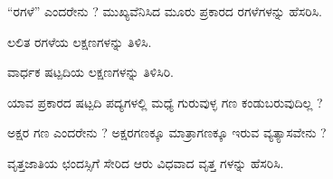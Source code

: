 \vspace{2.5pt plus 3pt minus 0.5pt}\noindent\hspace*{1.2em}\hspace{0.55em}“ರಗಳೆ” ಎಂದರೇನು ? ಮುಖ್ಯವೆನಿಸಿದ ಮೂರು ಪ್ರಕಾರದ ರಗಳೆಗಳನ್ನು ಹೆಸರಿಸಿ.\par

\vspace{2.5pt plus 3pt minus 0.5pt}\noindent\hspace*{1.2em}\hspace{0.55em}ಲಲಿತ ರಗಳೆಯ ಲಕ್ಷಣಗಳನ್ನು ತಿಳಿಸಿ.\par

\vspace{2.5pt plus 3pt minus 0.5pt}\noindent\hspace*{1.2em}\hspace{0.55em}ವಾರ್ಧಕ ಷಟ್ಪದಿಯ ಲಕ್ಷಣಗಳನ್ನು ತಿಳಿಸಿರಿ.\par

\vspace{2.5pt plus 3pt minus 0.5pt}\noindent\hspace*{1.2em}\hspace{0.55em}ಯಾವ ಪ್ರಕಾರದ ಷಟ್ಪದಿ ಪದ್ಯಗಳಲ್ಲಿ ಮಧ್ಯೆ ಗುರುವುಳ್ಳ ಗಣ ಕಂಡುಬರುವುದಿಲ್ಲ ?\par

\vspace{2.5pt plus 3pt minus 0.5pt}\noindent\hspace*{1.2em}\hspace{0.55em}ಅಕ್ಷರ ಗಣ ಎಂದರೇನು ? ಅಕ್ಷರಗಣಕ್ಕೂ ಮಾತ್ರಾಗಣಕ್ಕೂ ಇರುವ ವ್ಯತ್ಯಾಸವೇನು ?\par

\vspace{2.5pt plus 3pt minus 0.5pt}\noindent\hspace*{1.2em}\hspace{0.55em}ವೃತ್ತಜಾತಿಯ ಛಂದಸ್ಸಿಗೆ ಸೇರಿದ ಆರು ವಿಧವಾದ ವೃತ್ತ ಗಳನ್ನು ಹೆಸರಿಸಿ.\par
